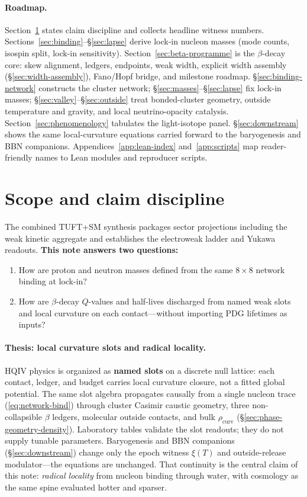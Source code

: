 \documentclass[11pt,notitlepage]{amsart}
\begin{document}
\paragraph{Roadmap.}
Section~\ref{sec:scope} states claim discipline and collects headline witness numbers.
Sections~\ref{sec:binding}--\S\ref{sec:lapse} derive lock-in nucleon masses (mode
counts, isospin split, lock-in sensitivity). Section~\ref{sec:beta-programme} is the
$\beta$-decay core: skew alignment, ledgers, endpoints, weak width, explicit width
assembly (\S\ref{sec:width-assembly}), Fano/Hopf bridge, and milestone roadmap. \S\ref{sec:binding-network} constructs the cluster network;
\S\ref{sec:masses}--\S\ref{sec:lapse} fix lock-in masses; \S\ref{sec:valley}--\S\ref{sec:outside} treat bonded-cluster geometry,
outside temperature and gravity, and local neutrino-opacity catalysis.
Section~\ref{sec:phenomenology} tabulates the light-isotope panel.
\S\ref{sec:downstream} shows the same local-curvature equations carried forward to
the baryogenesis and BBN companions. Appendices~\ref{app:lean-index}
and~\ref{app:scripts} map reader-friendly names to Lean modules and reproducer scripts.

\section{Scope and claim discipline}
\label{sec:scope}

The combined TUFT+SM synthesis \cite{hqiv-tuft-sm-lagrangian-paper} packages sector
projections including the weak kinetic aggregate and establishes the electroweak
ladder and Yukawa readouts.
\textbf{This note answers two questions:}
\begin{enumerate}[leftmargin=2em]
\item How are proton and neutron masses defined from the same $8\times8$ network
  binding at lock-in?
\item How are $\beta$-decay $Q$-values and half-lives discharged from named weak
  slots and local curvature on each contact---without importing PDG lifetimes as inputs?
\end{enumerate}

\paragraph{Thesis: local curvature slots and radical locality.}
HQIV physics is organized as \textbf{named slots} on a discrete null lattice: each
contact, ledger, and budget carries local curvature closure, not a fitted global
potential. The same slot algebra propagates causally from a single nucleon trace
(\eqref{eq:network-bind}) through cluster Casimir caustic geometry, three non-collapsible
$\beta$ ledgers, molecular outside contacts, and bulk $\rho_{\mathrm{curv}}$
(\S\ref{sec:phase-geometry-density}). Laboratory tables validate the slot readouts;
they do not supply tunable parameters. Baryogenesis and BBN companions
(\S\ref{sec:downstream}) change only the epoch witness $\xi(T)$ and outside-release
modulator---the equations are unchanged. That continuity is the central claim of this
note: \emph{radical locality} from nucleon binding through water, with cosmology as
the same spine evaluated hotter and sparser.
\end{document}
